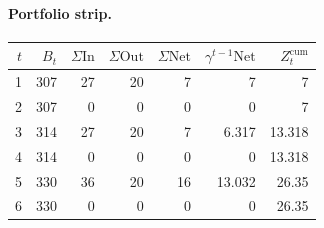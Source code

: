 \documentclass[12pt, a4paper]{article}
\begin{document}
\paragraph{Portfolio strip.}
\begin{center}
\begin{tabular}{rrrrrrr}
\toprule
$t$ & $B_t$ & $\Sigma\mathrm{In}$ & $\Sigma\mathrm{Out}$ & $\Sigma\mathrm{Net}$ & $\gamma^{t-1}\mathrm{Net}$ & $Z_t^{\mathrm{cum}}$\\
\midrule
1 & 307 & 27 & 20 & 7 & 7 & 7 \\
2 & 307 & 0 & 0 & 0 & 0 & 7 \\
3 & 314 & 27 & 20 & 7 & 6.317 & 13.318 \\
4 & 314 & 0 & 0 & 0 & 0 & 13.318 \\
5 & 330 & 36 & 20 & 16 & 13.032 & 26.35 \\
6 & 330 & 0 & 0 & 0 & 0 & 26.35 \\
\bottomrule
\end{tabular}
\end{center}
\end{document}
